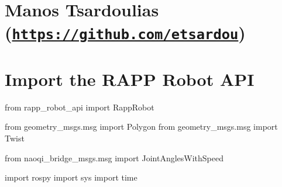 \section*{Manos Tsardoulias (\href{https://github.com/etsardou}{\tt https\-://github.\-com/etsardou})}

\section*{Import the R\-A\-P\-P Robot A\-P\-I}

from rapp\-\_\-robot\-\_\-api import Rapp\-Robot

from geometry\-\_\-msgs.\-msg import Polygon from geometry\-\_\-msgs.\-msg import Twist

from naoqi\-\_\-bridge\-\_\-msgs.\-msg import Joint\-Angles\-With\-Speed

import rospy import sys import time

